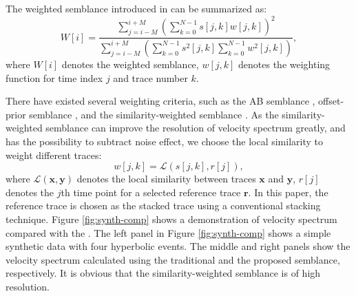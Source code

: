 The weighted semblance introduced in \cite{yangkang2015vel} can be summarized as:
\begin{equation}
\label{eq:semb-weight}
W[i] = \frac{\displaystyle\sum_{j=i-M}^{i+M}\left(\sum_{k=0}^{N-1}s[j,k]w[j,k]\right)^2}{\displaystyle \sum_{j=i-M}^{i+M}\left(\sum_{k=0}^{N-1}s^2[j,k]\sum_{k=0}^{N-1}w^2[j,k]\right)},
\end{equation}
where $W[i]$ denotes the weighted semblance, $w[j,k]$ denotes the weighting function for time index $j$ and trace number $k$.

There have existed several weighting criteria, such as the AB semblance \cite[]{fomel20091}, offset-prior semblance \cite[]{luosimon2012}, and the similarity-weighted semblance \cite[]{yangkang2015vel}. As the similarity-weighted semblance can improve the resolution of velocity spectrum greatly, and has the possibility to subtract noise effect, we choose the local similarity \cite[]{fomel2007localattr} to weight different traces:
\begin{equation}
\label{eq:simiweight}
w[j,k]=\mathcal{L}(s[j,k],r[j]),
\end{equation}
where $\mathcal{L}(\mathbf{x},\mathbf{y})$ denotes the local similarity between traces $\mathbf{x}$ and $\mathbf{y}$, $r[j]$ denotes the $j$th time point for a selected reference trace $\mathbf{r}$. In this paper, the reference trace is chosen as the stacked trace using a conventional stacking technique. Figure \ref{fig:synth-comp} shows a demonstration of   velocity spectrum  compared with the
. The left panel in Figure \ref{fig:synth-comp} shows a simple synthetic data with four hyperbolic events. The middle and right panels show the velocity spectrum calculated using the traditional and the proposed semblance, respectively. It is obvious that the similarity-weighted semblance is of  high resolution.



